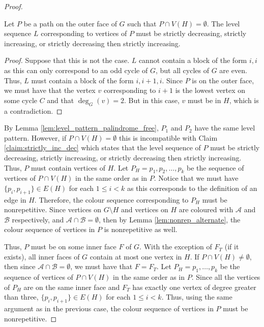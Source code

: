 \documentclass{patmorin}
\begin{document}
\begin{proof}
 \begin{clm}  
  Let $P$ be a path on the outer face of $G$ such that $P \cap V(H) = \emptyset$. The level sequence $L$ corresponding to vertices of $P$ must be strictly decreasing, strictly increasing, or strictly decreasing then strictly increasing.
 \end{clm}
 \begin{proof}
 Suppose that this is not the case. $L$ cannot contain a block of the form $i,i$ as this can only correspond to an odd cycle of $G$, but all cycles of $G$ are even. Thus, $L$ must contain a block of the form $i,i+1,i$. Since $P$ is on the outer face, we must have that the vertex $v$ corresponding to $i+1$ is the lowest vertex on some cycle $C$ and that $\deg_G(v)=2$. But in this case, $v$ must be in $H$, which is a contradiction. 
 \end{proof}
 By Lemma \ref{lem:level_pattern_palindrome_free}, $P_1$ and $P_2$ have the same level pattern. However, if $P \cap V(H) = \emptyset$ this is incompatible with Claim \ref{claim:strictly_inc_dec} which states that the level sequence of $P$ must be strictly decreasing, strictly increasing, or strictly decreasing then strictly increasing.  Thus, $P$ must contain vertices of $H$. Let $P_H=p_1,p_2,\ldots,p_k$ be the sequence of vertices of $P \cap V(H)$ in the same order as in $P$. Notice that we must have $\{p_i,p_{i+1}\}\in E(H)$ for each $1 \leq i < k$ as this corresponds to the definition of an edge in $H$. Therefore, the colour sequence corresponding to $P_H$ must be nonrepetitive. Since vertices on $G\setminus{H}$ and vertices on $H$ are coloured with $\mathcal{A}$ and $\mathcal{B}$ respectively, and $\mathcal{A} \cap \mathcal{B} = \emptyset$, then by Lemma \ref{lem:nonrep_alternate}, the colour sequence of vertices in $P$ is nonrepetitive as well. 
 
 Thus, $P$ must be on some inner face $F$ of $G$. With the exception of $F_T$ (if it exists), all inner faces of $G$ contain at most one vertex in $H$. If $P\cap V(H) \not= \emptyset$, then since $\mathcal{A} \cap \mathcal{B} = \emptyset$, we must have that $F=F_T$. Let $P_H=p_1,\ldots,p_k$ be the sequence of vertices of $P \cap V(H)$ in the same order as in $P$. Since all the vertices of $P_H$ are on the same inner face and $F_T$ has exactly one vertex of degree greater than three, $\{p_i,p_{i+1}\}\in E(H)$ for each $1 \leq i < k$. Thus, using the same argument as in the previous case, the colour sequence of vertices in $P$ must be nonrepetitive. 
 

\end{proof}
\end{document}
